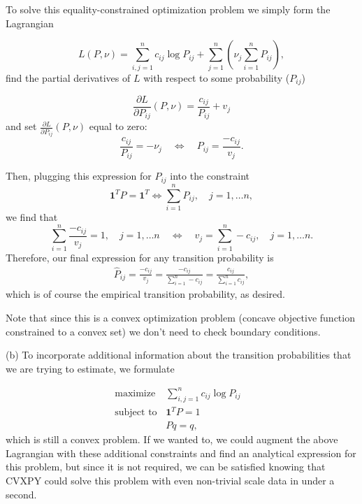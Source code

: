 \documentclass[12pt,reqno]{article}
\theoremstyle{definition}
\numberwithin{equation}{section}
\begin{document}
\noindent To solve this equality-constrained optimization problem we simply form the Lagrangian

\[L(P, \nu) = \sum_{i, j=1}^{n} c_{ij}\log P_{ij} + \sum_{j=1}^{n} \left(\nu_j \sum_{i=1}^{n}P_{ij} \right),\]
find the partial derivatives of $L$ with respect to some probability ($P_{ij}$)

\[\frac{\partial L}{\partial P_{ij}}(P, \nu) = \frac{c_{ij}}{P_{ij}} + v_{j}\]
and set $\frac{\partial L}{\partial P_{ij}}(P, \nu)$ equal to zero:
\[\frac{c_{ij}}{P_{ij}} = - \nu_j \quad \Longleftrightarrow \quad P_{ij} = \frac{-c_{ij}}{v_{j}}.\]

\noindent Then, plugging this expression for $P_{ij}$ into the constraint 
\[\bm{1}^T P = \bm{1}^T \Longleftrightarrow \sum_{i=1}^{n}P_{ij}, \quad j = 1, \ldots n,\]
we find that
\[\sum_{i=1}^{n}\frac{-c_{ij}}{v_{j}} = 1, \quad j= 1, \ldots n \quad \Longleftrightarrow \quad v_j = \sum_{i=1}^{n}-c_{ij}, \quad j = 1, \ldots n.\]
Therefore, our final expression for any transition probability is
\[\begin{aligned}
    \hat{P}_{ij} = \frac{-c_{ij}}{v_{j}} = \frac{-c_{ij}}{\sum_{i=1}^{n}-c_{ij}} = \frac{c_{ij}}{\sum_{i=1}^{n}c_{ij}},
\end{aligned}\]
which is of course the empirical transition probability, as desired.

\noindent Note that since this is a convex optimization problem (concave objective function constrained to a convex set)
we don't need to check boundary conditions.

\vspace{0.1cm}
\noindent (b) To incorporate additional information about the transition probabilities that we are trying to estimate,
we formulate

\[\begin{array}{lll}
    \text{maximize} \; & \sum_{i, j=1}^{n} c_{ij}\log P_{ij} & \\
    \text{subject to} & \bm{1}^T P = 1 & \\
    & Pq = q,
    \end{array}\]
which is still a convex problem. If we wanted to, we could augment the above Lagrangian with
these additional constraints and find an analytical expression for this problem, but since it is not
required, we can be satisfied knowing that CVXPY could solve this problem with even non-trivial scale data
in under a second.
\end{document}
